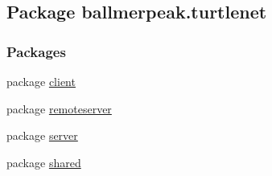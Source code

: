 \hypertarget{namespaceballmerpeak_1_1turtlenet}{\subsection{Package ballmerpeak.\-turtlenet}
\label{namespaceballmerpeak_1_1turtlenet}
}
\subsubsection*{Packages}
\begin{DoxyCompactItemize}
\item 
package \hyperlink{namespaceballmerpeak_1_1turtlenet_1_1client}{client}
\item 
package \hyperlink{namespaceballmerpeak_1_1turtlenet_1_1remoteserver}{remoteserver}
\item 
package \hyperlink{namespaceballmerpeak_1_1turtlenet_1_1server}{server}
\item 
package \hyperlink{namespaceballmerpeak_1_1turtlenet_1_1shared}{shared}
\end{DoxyCompactItemize}
